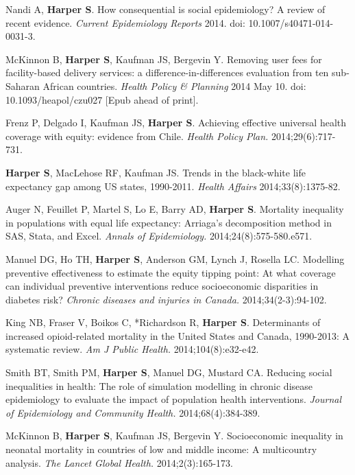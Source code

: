 \documentclass[
  letterpaper,
  DIV=11,
  numbers=noendperiod]{scrartcl}
\begin{document}
\begin{etaremune}
\item Nandi A, \textbf{Harper S}. How consequential is social epidemiology? A review of recent evidence. \emph{Current Epidemiology Reports} 2014. doi: 10.1007/s40471-014-0031-3.
 
\item *McKinnon B, \textbf{Harper S}, Kaufman JS, Bergevin Y. Removing user fees for facility-based delivery services: a difference-in-differences evaluation from ten sub-Saharan African countries. \emph{Health Policy \& Planning} 2014 May 10. doi: 10.1093/heapol/czu027 [Epub ahead of print].

\item Frenz P, Delgado I, Kaufman JS, \textbf{Harper S}. Achieving effective universal health coverage with equity: evidence from Chile. \emph{Health Policy Plan.} 2014;29(6):717-731.
 
\item \textbf{Harper S}, MacLehose RF, Kaufman JS. Trends in the black-white life expectancy gap among US states, 1990-2011. \emph{Health Affairs} 2014;33(8):1375-82.
 
\item Auger N, Feuillet P, Martel S, Lo E, Barry AD, \textbf{Harper S}. Mortality inequality in populations with equal life expectancy: Arriaga's decomposition method in SAS, Stata, and Excel. \emph{Annals of Epidemiology.} 2014;24(8):575-580.e571.
 
\item Manuel DG, Ho TH, \textbf{Harper S}, Anderson GM, Lynch J, Rosella LC. Modelling preventive effectiveness to estimate the equity tipping point: At what coverage can individual preventive interventions reduce socioeconomic disparities in diabetes risk? \emph{Chronic diseases and injuries in Canada.} 2014;34(2-3):94-102.
 
\item King NB, Fraser V, Boikos C, *Richardson R, \textbf{Harper S}. Determinants of increased opioid-related mortality in the United States and Canada, 1990-2013: A systematic review. \emph{Am J Public Health.} 2014;104(8):e32-e42.
 
\item Smith BT, Smith PM, \textbf{Harper S}, Manuel DG, Mustard CA. Reducing social inequalities in health: The role of simulation modelling in chronic disease epidemiology to evaluate the impact of population health interventions. \emph{Journal of Epidemiology and Community Health.} 2014;68(4):384-389.
 
\item *McKinnon B, \textbf{Harper S}, Kaufman JS, Bergevin Y. Socioeconomic inequality in neonatal mortality in countries of low and middle income: A multicountry analysis. \emph{The Lancet Global Health.} 2014;2(3):165-173.
 

\end{etaremune}
\end{document}
